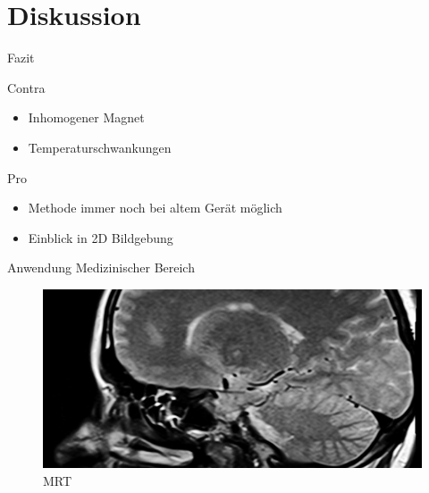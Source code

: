 \section{Diskussion}
\begin{frame}{Fazit}
	\begin{alertblock}{Contra}
	\begin{itemize}
	\item Inhomogener Magnet
	\item Temperaturschwankungen
	\end{itemize}
	\end{alertblock}
	\begin{exampleblock}{Pro}
	\begin{itemize}
	\item Methode immer noch bei altem Gerät möglich
	\item Einblick in 2D Bildgebung 
	\end{itemize}
	\end{exampleblock}
\end{frame}

\begin{frame}{Anwendung}
Medizinischer Bereich
	\begin{figure}
	\centering
	\includegraphics[scale=.35]{images//mrt.jpg}
	\caption{MRT}
	\end{figure}
\end{frame}